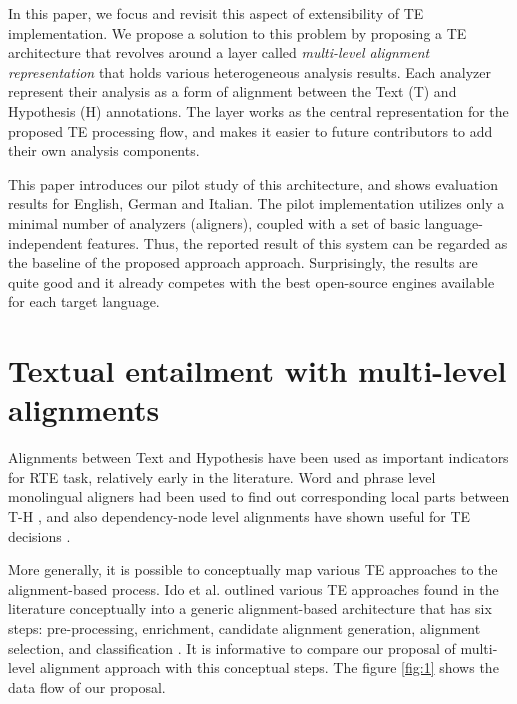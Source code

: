 \documentclass[11pt,letterpaper]{article}
\begin{document}
In this paper, we focus and revisit this aspect of extensibility of TE
implementation. We propose a solution to this problem by proposing a 
TE architecture that revolves around a layer called {\em multi-level
  alignment representation} that holds various heterogeneous analysis
results. Each analyzer represent their analysis as a form of alignment
between the Text (T) and Hypothesis (H) annotations. The layer works
as the central representation for the proposed TE processing flow, and
makes it easier to future contributors to add their own analysis
components. 

This paper introduces our pilot study of this architecture, and shows
evaluation results for English, German and Italian. The pilot
implementation utilizes only a minimal number of analyzers (aligners),
coupled with a set of basic language-independent features. Thus, the 
reported result of this system can be regarded as the baseline of the
proposed approach approach. Surprisingly, the results are quite good
and it already competes with the best open-source engines available
for each target language. 

\section{Textual entailment with multi-level alignments}
Alignments between Text and Hypothesis have been used as important
indicators for RTE task, relatively early in the literature. Word and
phrase level monolingual aligners had been used to find out
corresponding local parts between T-H \cite{}, and also
dependency-node level alignments have shown useful for TE decisions
\cite{}.      

More generally, it is possible to conceptually map various TE
approaches to the alignment-based process. Ido et al. outlined various
TE approaches found in the literature conceptually into a generic
alignment-based architecture that has six steps: pre-processing,
enrichment, candidate alignment generation, alignment selection, and
classification \cite{}.   
It is informative to compare our proposal of multi-level alignment 
approach with this conceptual steps. The figure \ref{fig:1} shows the
data flow of our proposal. 
\end{document}
